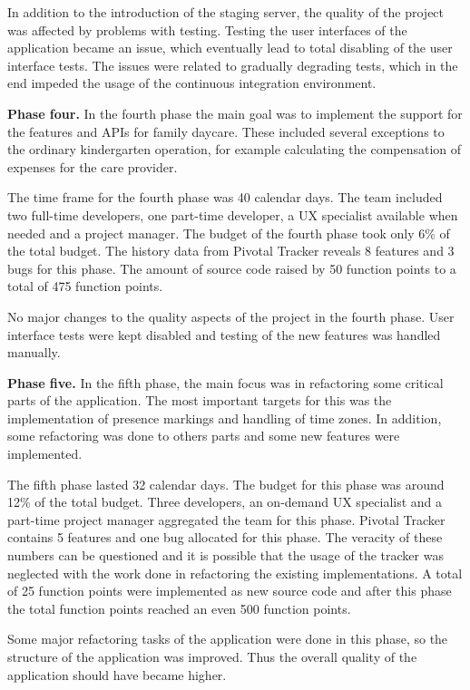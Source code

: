 In addition to the introduction of the staging server, the quality of the project was affected by problems with testing. Testing the user interfaces of the application became an issue, which eventually lead to total disabling of the user interface tests. The issues were related to gradually degrading tests, which in the end impeded the usage of the continuous integration environment.

\textbf{Phase four.} In the fourth phase the main goal was to implement the support for the features and APIs for family daycare. These included several exceptions to the ordinary kindergarten operation, for example calculating the compensation of expenses for the care provider.

The time frame for the fourth phase was 40 calendar days. The team included two full-time developers, one part-time developer, a UX specialist available when needed and a project manager. The budget of the fourth phase took only 6\% of the total budget. The history data from Pivotal Tracker reveals 8 features and 3 bugs for this phase. The amount of source code raised by 50 function points to a total of 475 function points.

No major changes to the quality aspects of the project in the fourth phase. User interface tests were kept disabled and testing of the new features was handled manually.


\textbf{Phase five.} In the fifth phase, the main focus was in refactoring some critical parts of the application. The most important targets for this was the implementation of presence markings and handling of time zones. In addition, some refactoring was done to others parts and some new features were implemented.

The fifth phase lasted 32 calendar days. The budget for this phase was around 12\% of the total budget. Three developers, an on-demand UX specialist and a part-time project manager aggregated the team for this phase. Pivotal Tracker contains 5 features and one bug allocated for this phase. The veracity of these numbers can be questioned and it is possible that the usage of the tracker was neglected with the work done in refactoring the existing implementations. A total of 25 function points were implemented as new source code and after this phase the total function points reached an even 500 function points. 

Some major refactoring tasks of the application were done in this phase, so the structure of the application was improved. Thus the overall quality of the application should have became higher.

